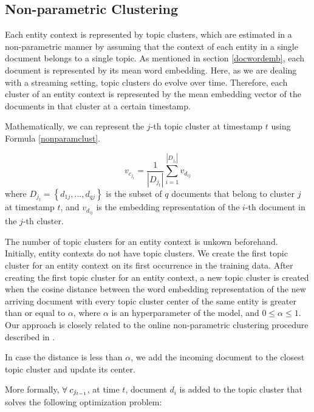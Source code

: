 \documentclass{article}
\begin{document}
\subsection{Non-parametric Clustering}

Each entity context is represented by topic clusters, which are estimated in a non-parametric manner by assuming that the context of each entity in a single document belongs to a single topic. As mentioned in section \ref{docwordemb}, each document is represented by its mean word embedding. Here, as we are dealing with a streaming setting, topic clusters do evolve over time. Therefore, each cluster of an entity context is represented by the mean embedding vector of the documents in that cluster at a certain timestamp.

Mathematically, we can represent the $j$-th topic cluster at timestamp $t$ using Formula \ref{nonparamclust}.

\begin{equation}
\label{nonparamclust}
v_{c_{j_t}} = \frac{1}{|D_{j_t}|} \sum_{i=1}^{|D_{j_t}|}{v_{d_{ij}}}
\end{equation}
where $D_{j_t} = \left\{ {d_{1j}, ..., d_{qj}} \right\}$ is the subset of $q$ documents that belong to cluster $j$ at timestamp $t$, and $v_{d_{ij}}$ is the embedding representation of the $i$-th document in the $j$-th cluster.

The number of topic clusters for an entity context is unkown beforehand. Initially, entity contexts do not have topic clusters. We create the first topic cluster for an entity context on its first occurrence in the training data. After creating the first topic cluster for an entity context, a new topic cluster is created when the cosine distance between the word embedding representation of the new arriving document with every topic cluster center of the same entity is greater than or equal to $\alpha$, where $\alpha$ is an hyperparameter of the model, and $0 \leq \alpha \leq 1$. Our approach is closely related to the online non-parametric clustering procedure described in \citet{Arvind14}.

In case the distance is less than $\alpha$, we add the incoming document to the closest topic cluster and update its center. 

More formally, $\forall\hspace{1mm}c_{j_{t-1}}$, at time $t$, document $d_i$ is added to the topic cluster that solves the following optimization problem:\\
\end{document}
